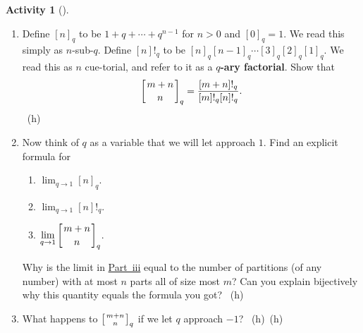 \documentclass[10pt,]{book}
\newcommand{\terminology}[1]{\textbf{#1}}
\theoremstyle{plain}
\theoremstyle{definition}
\theoremstyle{definition}
\theoremstyle{definition}
\newtheorem{activity}[project]{Activity}
\numberwithin{equation}{chapter}
\newcommand{\qchoose}[2]{\left[{#1\atop#2}\right]_q}
\begin{document}
\begin{activity}[]
\begin{enumerate}[font=\bfseries,label=(\alph*),ref=\alph*]
\begin{enumerate}[font=\bfseries,label=(\roman*),ref=\theenumi.\roman*]
The largest part of a partition counted by \(\qchoose{m+n}{n}\) is either \(m\) or is less than or equal to \(m-1\).  In the second case, the partition fits into a rectangle that is at most \(m-1\) units wide and at most \(n\) units deep.  What is the generating function for partitions of this type?  In the first case, what kind of rectangle does the partition we get by removing the largest part sit in?  What is the generating function for partitions that sit in this kind of rectangle?  What is the generating function for partitions that sit in this kind of rectangle after we remove a largest part of size \(m\)?  What recurrence relation does this give you?%
\item\label{task-285} \hypertarget{p-1630}{}%
What recurrence do you get from the other operation we studied in \hyperref[numberpartitionrecurrence]{Activity~\ref{numberpartitionrecurrence}}?%
\item\label{task-286} \hypertarget{p-1632}{}%
It is quite likely that the two recurrences you got are different.  One would expect that they might give different values for \(\qchoose{m+n}{n}\).  Can you resolve this potential conflict?%
~{\tiny (h)}\end{enumerate}
\item\label{task-287} \hypertarget{p-1635}{}%
Define \([n]_q\) to be \(1+q+\cdots+q^{n-1}\) for \(n>0\) and \([0]_q =1\).  We read this simply as \(n\)-sub-\(q\). Define \([n]!_q\) to be \([n]_q[n-1]_q\cdots [3]_q[2]_q[1]_q\). We read this as \(n\) cue-torial, and refer to it as a \terminology{\(q\)-ary factorial}. Show that%
\begin{equation*}
\qchoose{m+n}{n} = \frac{[m+n]!_q}{[m]!_q[n]!_q}.
\end{equation*}
%
~{\tiny (h)}\item\label{task-288} \hypertarget{p-1639}{}%
Now think of \(q\) as a variable that we will let approach \(1\). Find an explicit formula for \leavevmode%
\begin{enumerate}[label=(\roman*)]
\item\hypertarget{li-64}{}\(\displaystyle\lim_{q\rightarrow 1} [n]_q\).%
\item\hypertarget{li-65}{}\(\displaystyle\lim_{q\rightarrow 1} [n]!_q\).%
\item\hypertarget{q-binomial-lim}{}\(\displaystyle\lim_{q\rightarrow 1} \qchoose{m+n}{n}\).%
\end{enumerate}
 Why is the limit in \hyperlink{q-binomial-lim}{Part~iii} equal to the number of partitions (of any number) with at most \(n\) parts all of size most \(m\)? Can you explain bijectively why this quantity equals the formula you got?%
~{\tiny (h)}\item\label{task-289} \hypertarget{p-1642}{}%
What happens to \(\qchoose{m+n}{n}\) if we let \(q\) approach \(-1\)?%
~{\tiny (h)}~{\tiny (h)}\end{enumerate}
\end{activity}
\end{document}
